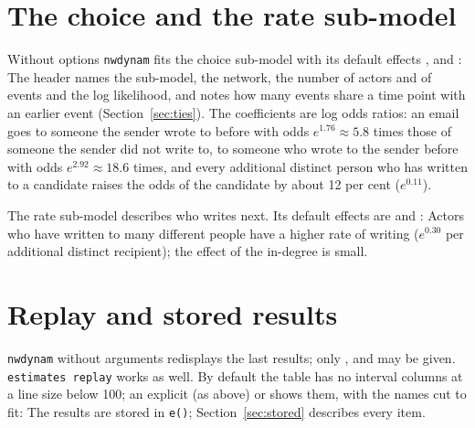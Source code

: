 \section{The choice and the rate sub-model}

Without options \texttt{nwdynam} fits the choice sub-model with its default effects ,  and :
The header names the sub-model, the network, the number of actors and of events and the log likelihood, and notes how many events share a time point with an earlier event (Section~\ref{sec:ties}). The coefficients are log odds ratios: an email goes to someone the sender wrote to before with odds $e^{1.76}\approx 5.8$ times those of someone the sender did not write to, to someone who wrote to the sender before with odds $e^{2.92}\approx 18.6$ times, and every additional distinct person who has written to a candidate raises the odds of the candidate by about 12 per cent ($e^{0.11}$).

The rate sub-model describes who writes next. Its default effects are  and :
Actors who have written to many different people have a higher rate of writing ($e^{0.30}$ per additional distinct recipient); the effect of the in-degree is small.

\section{Replay and stored results}

\texttt{nwdynam} without arguments redisplays the last results; only ,  and  may be given. \texttt{estimates replay} works as well.
By default the table has no interval columns at a line size below 100; an explicit  (as above) or  shows them, with the names cut to fit:
The results are stored in \texttt{e()}; Section~\ref{sec:stored} describes every item.
